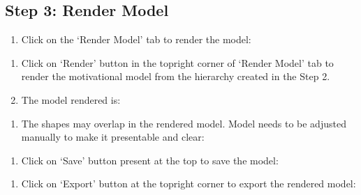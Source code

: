 \documentclass[letterpaper,10pt,english]{jupyterBook}
\begin{document}
\subsection{Step 3: Render Model}
\label{\detokenize{appendices/appendix_b/motivational_model_guide:step-3-render-model}}\begin{enumerate}
%
\item {} 
\sphinxAtStartPar
Click on the ‘Render Model’ tab to render the model:

\end{enumerate}

\sphinxAtStartPar
{}
\begin{enumerate}
%
\item {} 
\sphinxAtStartPar
Click on ‘Render’ button in the top\sphinxhyphen{}right corner of ‘Render Model’
tab to render the motivational model from the hierarchy created in
the Step 2.

\item {} 
\sphinxAtStartPar
The model rendered is:

\end{enumerate}

\sphinxAtStartPar
{}
\begin{enumerate}
%
\item {} 
\sphinxAtStartPar
The shapes may overlap in the rendered model. Model needs to be
adjusted manually to make it presentable and clear:

\end{enumerate}

\sphinxAtStartPar
{}
\begin{enumerate}
%
\item {} 
\sphinxAtStartPar
Click on ‘Save’ button present at the top to save the model:

\end{enumerate}

\sphinxAtStartPar
{}
\begin{enumerate}
%
\item {} 
\sphinxAtStartPar
Click on ‘Export’ button at the top\sphinxhyphen{}right corner to export the
rendered model:

\end{enumerate}
\end{document}
